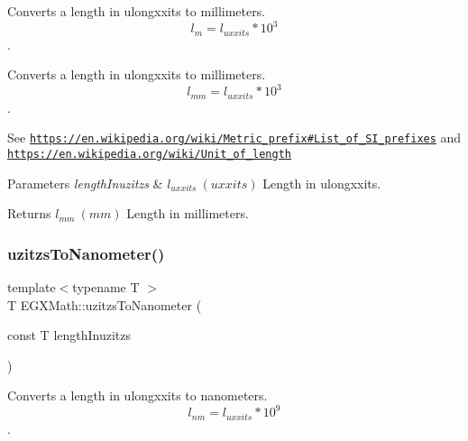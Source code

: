 Converts a length in ulongxxits to millimeters. \[ l_{m}=l_{uxxits} * 10^{3} \]. 

Converts a length in ulongxxits to millimeters. \[ l_{mm}=l_{uxxits} * 10^{3} \].

See \href{https://en.wikipedia.org/wiki/Metric_prefix#List_of_SI_prefixes}{\tt https\+://en.\+wikipedia.\+org/wiki/\+Metric\+\_\+prefix\#\+List\+\_\+of\+\_\+\+S\+I\+\_\+prefixes} and \href{https://en.wikipedia.org/wiki/Unit_of_length}{\tt https\+://en.\+wikipedia.\+org/wiki/\+Unit\+\_\+of\+\_\+length} 
\begin{DoxyParams}{Parameters}
{\em length\+Inuzitzs} & $ l_{uxxits}\ (uxxits)$ Length in ulongxxits. \\
\hline
\end{DoxyParams}
\begin{DoxyReturn}{Returns}
$ l_{mm}\ (mm)$ Length in millimeters. 
\end{DoxyReturn}
\mbox{\label{group___e_g_x_math-_conversions-_length_conversions-uzitzs-_s_i_ga6c21ffa2ef282d817d349c249eaaa21f}} 
\subsubsection{\texorpdfstring{uzitzs\+To\+Nanometer()}{uzitzsToNanometer()}}
{\footnotesize\ttfamily template$<$typename T $>$ \\
T E\+G\+X\+Math\+::uzitzs\+To\+Nanometer (\begin{DoxyParamCaption}\item[{const T}]{length\+Inuzitzs }\end{DoxyParamCaption})}



Converts a length in ulongxxits to nanometers. \[ l_{nm}=l_{uxxits} * 10^{9} \]. 


